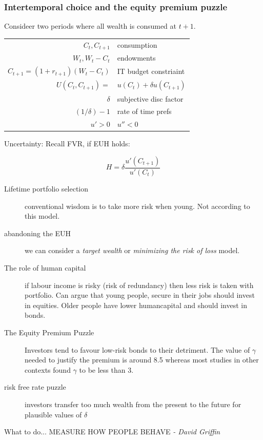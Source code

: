 \documentclass[a4paper,12pt]{article}
\begin{document}
\begin{multicols}{2}
\subsubsection*{Intertemporal choice and the equity premium puzzle}

Consideer two periods where  all wealth is consumed at $t+1$.

\begin{tabular}{rl}
$C_t, C_{t+1}$& consumption\\
$W_t, W_t-C_t$& endowments\\
$C_{t+1}=(1+r_{t+1})(W_t-C_t)$& IT budget constriaint\\
$U(C_t,C_{t+1})=$&$u(C_t)+\delta u(C_{t+1})$\\
$\delta$& subjective disc factor\\
$(1/\delta)-1$& rate of time prefs\\
$u'>0$&$u''<0$\\
\end{tabular}

Uncertainty: Recall FVR, if EUH holds:

\[H=\delta\frac{u'(C_{t+1})}{u'(C_t)}\]
\begin{description}
\item[Lifetime portfolio selection] conventional wisdom is to take more risk
when young. Not according to this model.

\item[abandoning the EUH] we can consider a \emph{target wealth} or
\emph{minimizing the risk of loss} model.

\item[The role of human capital] if labour income is risky (risk of redundancy)
then less risk is taken with portfolio. Can argue that young people, secure in
their jobs should invest in equities. Older people have lower humancapital and
should invest in bonds.

\item[The Equity Premium Puzzle] Investors tend to favour low-risk bonds to
their detriment. The value of $\gamma$ needed to justify the premium is around
8.5 whereas most studies in other contexts found $\gamma$ to be less than 3.

\item[risk free rate puzzle] investors transfer too much wealth from the
present to the future for plausible values of $\delta$

\end{description}

What to do... MEASURE HOW PEOPLE BEHAVE \emph{ - David Griffin}


\end{multicols}
\end{document}

